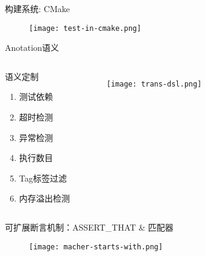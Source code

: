 \begin{frame}{构建系统: CMake}
    \centering
    \begin{figure}
      \centering
      \texttt{[image: test-in-cmake.png]}
    \end{figure}
\end{frame}

\begin{frame}{Anotation语义}
  \begin{columns}
     \begin{block}{语义定制}
       \begin{enumerate}
         \item 测试依赖
         \item 超时检测
         \item 异常检测
         \item 执行数目 
         \item Tag标签过滤
         \item 内存溢出检测
       \end{enumerate}
     \end{block}

    \begin{figure}
      \centering
      \texttt{[image: trans-dsl.png]}
    \end{figure}
  \end{columns}
\end{frame}

\begin{frame}{可扩展断言机制：ASSERT\_THAT \& 匹配器}
    \centering
    \begin{figure}
      \centering
      \texttt{[image: macher-starts-with.png]}
    \end{figure}
\end{frame}
